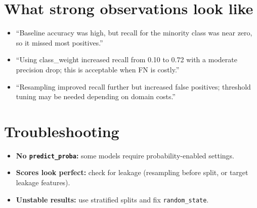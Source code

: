 \documentclass[11pt]{article}
\begin{document}
\section{What strong observations look like}
\begin{itemize}[leftmargin=*]
  \item ``Baseline accuracy was high, but recall for the minority class was near zero, so it missed most positives.''
  \item ``Using class\_weight increased recall from 0.10 to 0.72 with a moderate precision drop; this is acceptable when FN is costly.''
  \item ``Resampling improved recall further but increased false positives; threshold tuning may be needed depending on domain costs.''
\end{itemize}

\section{Troubleshooting}
\begin{itemize}[leftmargin=*]
  \item \textbf{No \texttt{predict\_proba}:} some models require probability-enabled settings.
  \item \textbf{Scores look perfect:} check for leakage (resampling before split, or target leakage features).
  \item \textbf{Unstable results:} use stratified splits and fix \texttt{random\_state}.
\end{itemize}

\notesources{\AIMLLabSources}
\end{document}
